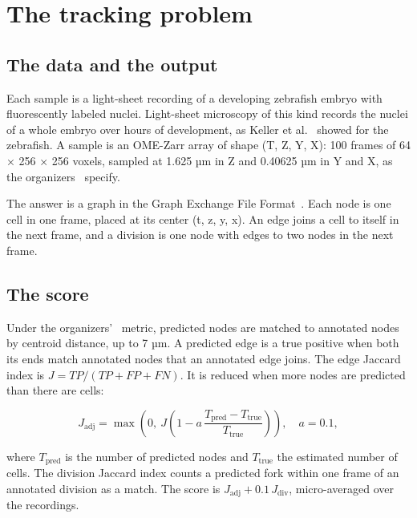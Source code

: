 \chapter{\texorpdfstring{The tracking problem}{The tracking problem}}
\label{chap:tracking-problem}

\section{\texorpdfstring{The data and the output}{The data and the output}}

Each sample is a light-sheet recording of a developing zebrafish embryo with fluorescently labeled nuclei. Light-sheet microscopy of this kind records the nuclei of a whole embryo over hours of development, as Keller et al.~\cite{src:Keller-2008} showed for the zebrafish. A sample is an OME-Zarr array of shape (T, Z, Y, X): 100 frames of 64 × 256 × 256 voxels, sampled at 1.625 µm in Z and 0.40625 µm in Y and X, as the organizers~\cite{src:Biohub-competition} specify.

The answer is a graph in the Graph Exchange File Format~\cite{src:GEFF}. Each node is one cell in one frame, placed at its center (t, z, y, x). An edge joins a cell to itself in the next frame, and a division is one node with edges to two nodes in the next frame.

\section{\texorpdfstring{The score}{The score}}

Under the organizers'~\cite{src:Biohub-competition} metric, predicted nodes are matched to annotated nodes by centroid distance, up to 7 µm. A predicted edge is a true positive when both its ends match annotated nodes that an annotated edge joins. The edge Jaccard index is \(J = TP / (TP + FP + FN)\). It is reduced when more nodes are predicted than there are cells:

\[
J_{\mathrm{adj}} = \max\left(0,\ J\left(1 - a\,\frac{T_{\mathrm{pred}} - T_{\mathrm{true}}}{T_{\mathrm{true}}}\right)\right), \quad a = 0.1,
\]

where \(T_{\mathrm{pred}}\) is the number of predicted nodes and \(T_{\mathrm{true}}\) the estimated number of cells. The division Jaccard index counts a predicted fork within one frame of an annotated division as a match. The score is \(J_{\mathrm{adj}} + 0.1\,J_{\mathrm{div}}\), micro-averaged over the recordings.

